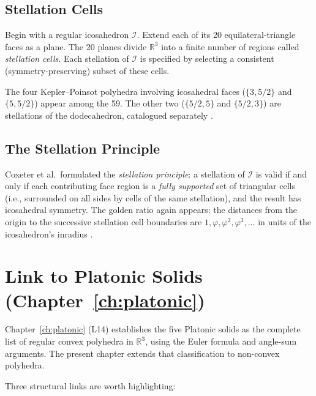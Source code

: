 \subsection{Stellation Cells}
\label{ssec:stellation-cells}

Begin with a regular icosahedron $\mathcal{I}$.  Extend each
of its 20 equilateral-triangle faces as a plane.  The 20
planes divide $\mathbb{R}^3$ into a finite number of regions
called \emph{stellation cells}.  Each stellation of
$\mathcal{I}$ is specified by selecting a consistent
(symmetry-preserving) subset of these cells.

The four Kepler–Poinsot polyhedra involving icosahedral faces
($\{3,5/2\}$ and $\{5,5/2\}$) appear among the 59.  The other
two ($\{5/2,5\}$ and $\{5/2,3\}$) are stellations of the
dodecahedron, catalogued separately \cite{coxeter_fifty_nine_icosahedra}.

\subsection{The Stellation Principle}
\label{ssec:stellation-principle}

Coxeter et al.\ formulated the \emph{stellation principle}:
a stellation of $\mathcal{I}$ is valid if and only if each
contributing face region is a \emph{fully supported} set of
triangular cells (i.e., surrounded on all sides by cells of the
same stellation), and the result has icosahedral symmetry.  The
golden ratio again appears: the distances from the origin to
the successive stellation cell boundaries are
$1, \varphi, \varphi^2, \varphi^3, \ldots$ in units of the
icosahedron's inradius \cite{coxeter_fifty_nine_icosahedra}.

\section{Link to Platonic Solids (Chapter~\ref{ch:platonic})}
\label{sec:link-platonic}

Chapter~\ref{ch:platonic} (L14) establishes the five Platonic
solids as the complete list of regular convex polyhedra in
$\mathbb{R}^3$, using the Euler formula and angle-sum arguments.
The present chapter extends that classification to
non-convex polyhedra.

Three structural links are worth highlighting:

